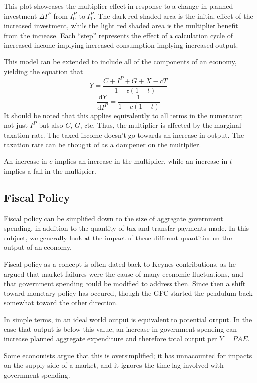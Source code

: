 \documentclass[12pt]{report}
\begin{document}
\begin{flushleft}
This plot showcases the multiplier effect in response to a change in planned
investment \(\Delta I^P\) from \(I^P_0\) to \(I^P_1\). The dark red shaded 
area is the initial effect of the increased investment, while the light red 
shaded area is the multiplier benefit from the increase. Each ``step'' 
represents the effect of a calculation cycle of increased income implying 
increased consumption implying increased output. \par
This model can be extended to include all of the components of an economy, 
yielding the equation that
\[Y  = \frac{\bar{C} + I^P + G + X - cT}{1  - c(1 - t)}\]
\[\frac{\mathrm{d}Y}{\mathrm{d}I^P} = \frac{1}{1 - c(1 - t)}\]
It should be noted that this applies equivalently to all terms in the 
numerator; not just \(I^P\) but also \(\bar{C}\), \(G\), etc. Thus, the 
multiplier is affected by the marginal taxation rate. The taxed income doesn't
go towards an increase in output. The taxation rate can be thought of as a 
dampener on the multiplier. \par
An increase in \(c\) implies an increase in the multiplier, while an increase
in \(t\) implies a fall in the multiplier.

\subsection*{Fiscal Policy}

Fiscal policy can be simplified down to the size of aggregate government
spending, in addition to the quantity of tax and transfer payments made. In
this subject, we generally look at the impact of these different quantities on
the output of an economy. \par
Fiscal policy as a concept is often dated back to Keynes contributions, as
he argued that market failures were the cause of many economic fluctuations,
and that government spending could be modified to address then. Since then a
shift toward monetary policy has occured, though the GFC started the pendulum
back somewhat toward the other direction. \par
In simple terms, in an ideal world output is equivalent to potential output. In
the case that output is below this value, an increase in government spending
can increase planned aggregate expenditure and therefore total output per 
\(Y = PAE\). \par
Some economists argue that this is oversimplified; it has unnacounted for
impacts on the supply side of a market, and it ignores the time lag involved
with government spending.


\end{flushleft}
\end{document}
